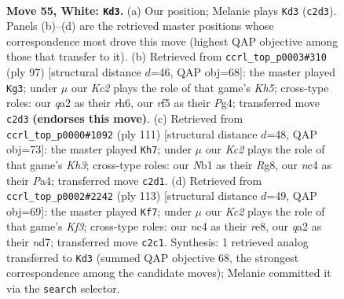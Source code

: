 \documentclass[11pt]{article}
\begin{document}
\clearpage

\begin{figure}[p]\centering
\begin{subfigure}{0.46\textwidth}\centering
\resizebox{\linewidth}{!}{%
\newchessgame
\chessboard[
  setfen={8/2k4p/8/p4r2/2np4/1R6/q1K1P3/1N6 w - - 4 55},
  showmover=false,
  pgfstyle=straightmove, color=movearrow, markmove={c2-d3}
]}
\caption{}
\end{subfigure}\hfill
\begin{subfigure}{0.46\textwidth}\centering
\resizebox{\linewidth}{!}{%
\newchessgame
\chessboard[
  setfen={8/8/n1N4R/1p6/1P1K2pk/r7/2P3P1/8 b - - 0 49},
  showmover=false,
  pgfstyle=straightmove, color=movearrow, markmove={h4-g3}
]}
\caption{}
\end{subfigure}
\\[4pt]
\begin{subfigure}{0.46\textwidth}\centering
\resizebox{\linewidth}{!}{%
\newchessgame
\chessboard[
  setfen={6r1/8/5Q1k/1P4r1/p1P5/8/1P5K/8 b - - 0 56},
  showmover=false,
  pgfstyle=straightmove, color=movearrow, markmove={h6-h7}
]}
\caption{}
\end{subfigure}\hfill
\begin{subfigure}{0.46\textwidth}\centering
\resizebox{\linewidth}{!}{%
\newchessgame
\chessboard[
  setfen={4R3/3N4/5k2/n4r2/1p2p1P1/8/2b3P1/6K1 b - - 1 57},
  showmover=false,
  pgfstyle=straightmove, color=movearrow, markmove={f6-f7}
]}
\caption{}
\end{subfigure}
\caption{\textbf{Move 55, White: \texttt{Kd3}.} (a) Our position; Melanie plays \texttt{Kd3} (\texttt{c2d3}). Panels (b)--(d) are the retrieved master positions whose correspondence most drove this move (highest QAP objective among those that transfer to it). (b) Retrieved from \texttt{ccrl\_top\_p0003\#310} (ply 97) [structural distance $d$=46, QAP obj=68]: the master played \texttt{Kg3}; under $\mu$ our \emph{Kc2} plays the role of that game's \emph{Kh5}; cross-type roles: our \emph{q}a2 as their \emph{r}h6, our \emph{r}f5 as their \emph{P}g4; transferred move \texttt{c2d3} \textbf{(endorses this move)}. (c) Retrieved from \texttt{ccrl\_top\_p0000\#1092} (ply 111) [structural distance $d$=48, QAP obj=73]: the master played \texttt{Kh7}; under $\mu$ our \emph{Kc2} plays the role of that game's \emph{Kh3}; cross-type roles: our \emph{N}b1 as their \emph{R}g8, our \emph{n}c4 as their \emph{P}a4; transferred move \texttt{c2d1}. (d) Retrieved from \texttt{ccrl\_top\_p0002\#2242} (ply 113) [structural distance $d$=49, QAP obj=69]: the master played \texttt{Kf7}; under $\mu$ our \emph{Kc2} plays the role of that game's \emph{Kf3}; cross-type roles: our \emph{n}c4 as their \emph{r}e8, our \emph{q}a2 as their \emph{n}d7; transferred move \texttt{c2c1}. Synthesis: 1 retrieved analog transferred to \texttt{Kd3} (summed QAP objective 68, the strongest correspondence among the candidate moves); Melanie committed it via the \texttt{search} selector.}
\label{fig:thought-m108}
\end{figure}
\end{document}
